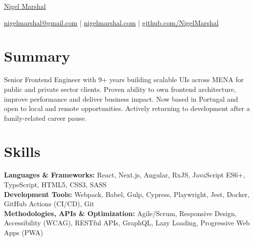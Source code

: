 \documentclass[10pt,letterpaper]{article}
\begin{document}

\centerline{\Huge \href{https://nigelmarshal.com}{Nigel Marshal}}

\vspace{5pt}


\centerline{\href{mailto:nigelmarshal@gmail.com}{nigelmarshal@gmail.com} | \href{https://nigelmarshal.com}{nigelmarshal.com} | \href{https://github.com/NigelMarshal}{github.com/NigelMarshal}}

\vspace{-10pt}
\section*{Summary}
Senior Frontend Engineer with 9+ years building scalable UIs across MENA for public and private sector clients. Proven ability to own frontend architecture, improve performance and deliver business impact. Now based in Portugal and open to local and remote opportunities. Actively returning to development after a family-related career pause.
\vspace{-9.5pt}


\section*{Skills}
\textbf{Languages \& Frameworks:} React, Next.js, Angular, RxJS, JavaScript ES6+, TypeScript, HTML5, CSS3, SASS \\
\textbf{Development Tools:} Webpack, Babel, Gulp, Cypress, Playwright, Jest, Docker, GitHub Actions (CI/CD), Git \\
\textbf{Methodologies, APIs \& Optimization:} Agile/Scrum, Responsive Design, Accessibility (WCAG), RESTful APIs, GraphQL, Lazy Loading, Progressive Web Apps (PWA)
\vspace{-9.5pt}
\end{document}
